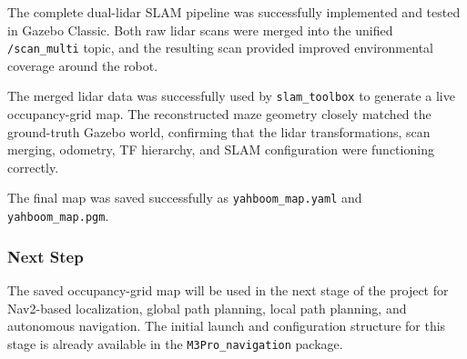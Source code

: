 \documentclass{article}
\begin{document}
The complete dual-lidar SLAM pipeline was successfully implemented and tested in Gazebo Classic. Both raw lidar scans were merged into the unified \texttt{/scan\_multi} topic, and the resulting scan provided improved environmental coverage around the robot.

The merged lidar data was successfully used by \texttt{slam\_toolbox} to generate a live occupancy-grid map. The reconstructed maze geometry closely matched the ground-truth Gazebo world, confirming that the lidar transformations, scan merging, odometry, TF hierarchy, and SLAM configuration were functioning correctly.

The final map was saved successfully as \texttt{yahboom\_map.yaml} and \texttt{yahboom\_map.pgm}.

\subsubsection{Next Step}

The saved occupancy-grid map will be used in the next stage of the project for Nav2-based localization, global path planning, local path planning, and autonomous navigation. The initial launch and configuration structure for this stage is already available in the \texttt{M3Pro\_navigation} package.
\end{document}
